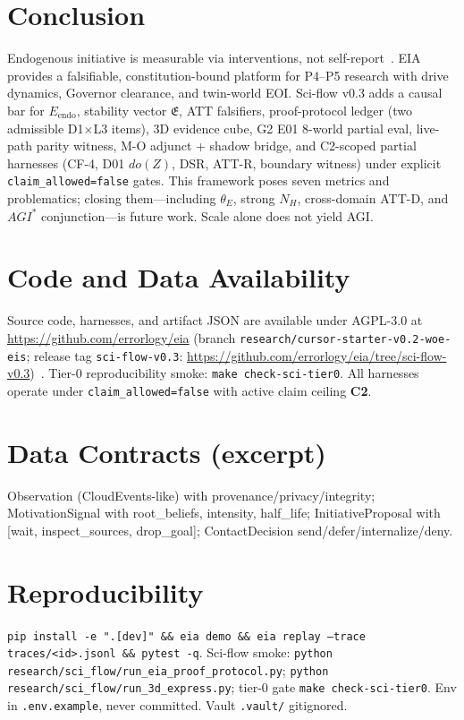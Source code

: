 \documentclass[11pt,a4paper]{article}
\theoremstyle{definition}
\begin{document}
\section{Conclusion}\label{sec:conclusion}
Endogenous initiative is measurable via interventions, not self-report~\cite{pearl2009causality,kuznetsov2026causal}. EIA provides a falsifiable, constitution-bound platform for P4--P5 research with drive dynamics, Governor clearance, and twin-world EOI. Sci-flow v0.3 adds a causal bar for $E_{\mathrm{endo}}$, stability vector $\mathfrak{E}$, ATT falsifiers, proof-protocol ledger (two admissible D1$\times$L3 items), 3D evidence cube, G2 E01 8-world partial eval, live-path parity witness, M-O adjunct + shadow bridge, and C2-scoped partial harnesses (CF-4, D01 $do(Z)$, DSR, ATT-R, boundary witness) under explicit \texttt{claim\_allowed=false} gates. This framework poses seven metrics and problematics; closing them---including $\theta_E$, strong $N_H$, cross-domain ATT-D, and $AGI^{*}$ conjunction---is future work. Scale alone does not yield AGI.

\section{Code and Data Availability}\label{sec:code-data}

Source code, harnesses, and artifact JSON are available under AGPL-3.0 at \url{https://github.com/errorlogy/eia} (branch \texttt{research/cursor-starter-v0.2-woe-eis}; release tag \texttt{sci-flow-v0.3}: \url{https://github.com/errorlogy/eia/tree/sci-flow-v0.3})~\cite{kuznetsov2026eia,kuznetsov2026sciflowrelease}. Tier-0 reproducibility smoke: \texttt{make check-sci-tier0}. All harnesses operate under \texttt{claim\_allowed=false} with active claim ceiling \textbf{C2}.




\appendix
\section{Data Contracts (excerpt)}
Observation (CloudEvents-like) with provenance/privacy/integrity; MotivationSignal with root\_beliefs, intensity, half\_life; InitiativeProposal with [wait, inspect\_sources, drop\_goal]; ContactDecision send/defer/internalize/deny.

\section{Reproducibility}
\texttt{pip install -e ".[dev]" \&\& eia demo \&\& eia replay --trace traces/<id>.jsonl \&\& pytest -q}. Sci-flow smoke: \texttt{python research/sci\_flow/run\_eia\_proof\_protocol.py}; \texttt{python research/sci\_flow/run\_3d\_express.py}; tier-0 gate \texttt{make check-sci-tier0}. Env in \texttt{.env.example}, never committed. Vault \texttt{.vault/} gitignored.
\end{document}
